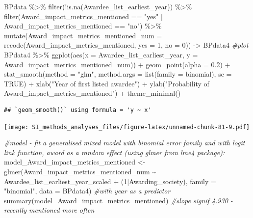 \documentclass[
]{article}
\newenvironment{Shaded}{\begin{snugshade}}{\end{snugshade}}
\newcommand{\AttributeTok}[1]{\textcolor[rgb]{0.77,0.63,0.00}{#1}}
\newcommand{\CommentTok}[1]{\textcolor[rgb]{0.56,0.35,0.01}{\textit{#1}}}
\newcommand{\ConstantTok}[1]{\textcolor[rgb]{0.00,0.00,0.00}{#1}}
\newcommand{\DecValTok}[1]{\textcolor[rgb]{0.00,0.00,0.81}{#1}}
\newcommand{\FloatTok}[1]{\textcolor[rgb]{0.00,0.00,0.81}{#1}}
\newcommand{\FunctionTok}[1]{\textcolor[rgb]{0.00,0.00,0.00}{#1}}
\newcommand{\NormalTok}[1]{#1}
\newcommand{\OtherTok}[1]{\textcolor[rgb]{0.56,0.35,0.01}{#1}}
\newcommand{\SpecialCharTok}[1]{\textcolor[rgb]{0.00,0.00,0.00}{#1}}
\newcommand{\StringTok}[1]{\textcolor[rgb]{0.31,0.60,0.02}{#1}}
\begin{document}
\begin{Shaded}
\begin{Highlighting}[]
\NormalTok{BPdata }\SpecialCharTok{\%\textgreater{}\%} 
  \FunctionTok{filter}\NormalTok{(}\SpecialCharTok{!}\FunctionTok{is.na}\NormalTok{(Awardee\_list\_earliest\_year)) }\SpecialCharTok{\%\textgreater{}\%} 
  \FunctionTok{filter}\NormalTok{(Award\_impact\_metrics\_mentioned }\SpecialCharTok{==} \StringTok{"yes"} \SpecialCharTok{|}\NormalTok{ Award\_impact\_metrics\_mentioned }\SpecialCharTok{==} \StringTok{"no"}\NormalTok{) }\SpecialCharTok{\%\textgreater{}\%}  
  \FunctionTok{mutate}\NormalTok{(}\AttributeTok{Award\_impact\_metrics\_mentioned\_num =} \FunctionTok{recode}\NormalTok{(Award\_impact\_metrics\_mentioned, }\AttributeTok{yes =} \DecValTok{1}\NormalTok{, }\AttributeTok{no =} \DecValTok{0}\NormalTok{)) }\OtherTok{{-}\textgreater{}}\NormalTok{ BPdata4}
\CommentTok{\#plot}
\NormalTok{BPdata4 }\SpecialCharTok{\%\textgreater{}\%} 
  \FunctionTok{ggplot}\NormalTok{(}\FunctionTok{aes}\NormalTok{(}\AttributeTok{x =}\NormalTok{ Awardee\_list\_earliest\_year, }\AttributeTok{y =}\NormalTok{ Award\_impact\_metrics\_mentioned\_num)) }\SpecialCharTok{+} 
  \FunctionTok{geom\_point}\NormalTok{(}\AttributeTok{alpha =} \FloatTok{0.2}\NormalTok{) }\SpecialCharTok{+} 
  \FunctionTok{stat\_smooth}\NormalTok{(}\AttributeTok{method =} \StringTok{"glm"}\NormalTok{, }\AttributeTok{method.args =} \FunctionTok{list}\NormalTok{(}\AttributeTok{family =}\NormalTok{ binomial), }\AttributeTok{se =} \ConstantTok{TRUE}\NormalTok{) }\SpecialCharTok{+}
  \FunctionTok{xlab}\NormalTok{(}\StringTok{"Year of first listed awardee"}\NormalTok{) }\SpecialCharTok{+} 
  \FunctionTok{ylab}\NormalTok{(}\StringTok{"Probability of Award\_impact\_metrics\_mentioned"}\NormalTok{) }\SpecialCharTok{+}
  \FunctionTok{theme\_minimal}\NormalTok{()}
\end{Highlighting}
\end{Shaded}

\begin{verbatim}
## `geom_smooth()` using formula = 'y ~ x'
\end{verbatim}

\texttt{[image: SI\_methods\_analyses\_files/figure-latex/unnamed-chunk-81-9.pdf]}

\begin{Shaded}
\begin{Highlighting}[]
\CommentTok{\#model {-} fit a generalised mixed model with binomial error family and with logit link function, award as a random effect (using glmer from lme4 package):}
\NormalTok{model\_Award\_impact\_metrics\_mentioned }\OtherTok{\textless{}{-}} \FunctionTok{glmer}\NormalTok{(Award\_impact\_metrics\_mentioned\_num }\SpecialCharTok{\textasciitilde{}}\NormalTok{ Awardee\_list\_earliest\_year\_scaled }\SpecialCharTok{+}\NormalTok{ (}\DecValTok{1}\SpecialCharTok{|}\NormalTok{Awarding\_society), }\AttributeTok{family =} \StringTok{"binomial"}\NormalTok{, }\AttributeTok{data =}\NormalTok{ BPdata4) }\CommentTok{\#with year as a predictor}
\FunctionTok{summary}\NormalTok{(model\_Award\_impact\_metrics\_mentioned) }\CommentTok{\#slope signif 4.930 {-} recently mentioned more often}
\end{Highlighting}
\end{Shaded}
\end{document}
